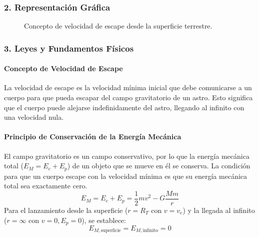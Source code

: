 \subsubsection*{2. Representación Gráfica}
\begin{figure}[H]
    \centering
    \caption{Concepto de velocidad de escape desde la superficie terrestre.}
\end{figure}

\subsubsection*{3. Leyes y Fundamentos Físicos}
\paragraph*{Concepto de Velocidad de Escape}
La velocidad de escape es la velocidad mínima inicial que debe comunicarse a un cuerpo para que pueda escapar del campo gravitatorio de un astro. Esto significa que el cuerpo puede alejarse indefinidamente del astro, llegando al infinito con una velocidad nula.
\paragraph*{Principio de Conservación de la Energía Mecánica}
El campo gravitatorio es un campo conservativo, por lo que la energía mecánica total ($E_M = E_c + E_p$) de un objeto que se mueve en él se conserva. La condición para que un cuerpo escape con la velocidad mínima es que su energía mecánica total sea exactamente cero.
$$ E_M = E_c + E_p = \frac{1}{2}mv^2 - G\frac{Mm}{r} $$
Para el lanzamiento desde la superficie ($r=R_T$ con $v=v_e$) y la llegada al infinito ($r=\infty$ con $v=0, E_p=0$), se establece:
$$ E_{M, \text{superficie}} = E_{M, \text{infinito}} = 0 $$

